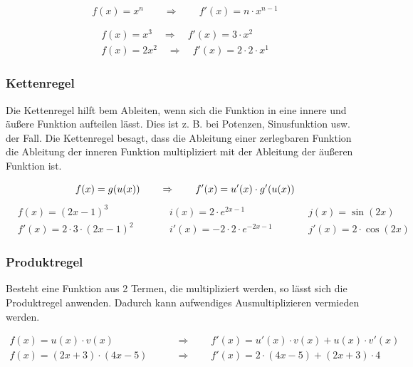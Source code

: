 \vspace*{-0.5cm}
\begin{equation*}
    f(x) = x^n \qquad \Rightarrow \qquad
    f'(x) = n \cdot x^{n - 1}
\end{equation*}

\vspace*{-1cm}
\begin{align*}
    f(x) = x^3 \quad \Rightarrow \quad
    f'(x) = 3 \cdot x^2 \\
    f(x) = 2x^2 \quad \Rightarrow \quad
    f'(x) = 2 \cdot 2 \cdot x^1
\end{align*}

\subsubsection{Kettenregel}

Die Kettenregel hilft bem Ableiten, wenn sich die Funktion in eine innere und äußere Funktion
aufteilen lässt. Dies ist z. B. bei Potenzen, Sinusfunktion usw. der Fall.
Die Kettenregel besagt, dass die Ableitung einer zerlegbaren Funktion die Ableitung
der inneren Funktion multipliziert mit der Ableitung der äußeren Funktion ist.

\begin{equation*}
    f(x) = g(u(x)) \qquad \Rightarrow \qquad
    f'(x) = u'(x) \cdot g'(u(x)) \\
\end{equation*}
\vspace*{-0.5cm}
\begin{align*}
    & f(x) = (2x - 1)^3 \qquad & & i(x) = 2 \cdot e^{2x - 1} \qquad & & j(x) = \sin(2x) \\
    & f'(x) = 2 \cdot 3 \cdot (2x - 1)^2 \qquad & & i'(x) = -2 \cdot 2 \cdot e^{-2x - 1} \qquad & & j'(x) = 2 \cdot \cos(2x)
\end{align*}

\subsubsection{Produktregel}
Besteht eine Funktion aus 2 Termen, die multipliziert werden, so lässt sich die Produktregel
anwenden. Dadurch kann aufwendiges Ausmultiplizieren vermieden werden.

\begin{align*}
    f(x) = u(x) \cdot v(x) \qquad & \Rightarrow \qquad
    f'(x) = u'(x) \cdot v(x) + u(x) \cdot v'(x) \\
    f(x) = (2x + 3) \cdot (4x - 5) \qquad & \Rightarrow \qquad
    f'(x) = 2 \cdot (4x - 5) + (2x + 3) \cdot 4
\end{align*}


